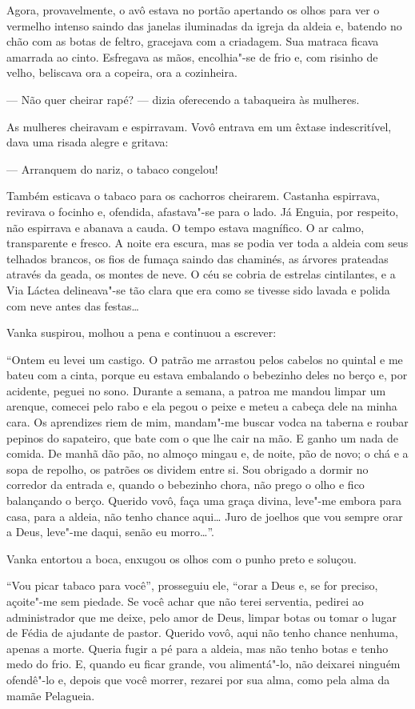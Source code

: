 Agora, provavelmente, o avô estava no portão apertando os olhos para ver
o vermelho intenso saindo das janelas iluminadas da igreja da aldeia
e, batendo no chão com as botas de feltro, gracejava com a criadagem.
Sua matraca ficava amarrada ao cinto. Esfregava as mãos, encolhia"-se de
frio e, com risinho de velho, beliscava ora a copeira, ora a cozinheira.

--- Não quer cheirar rapé? --- dizia oferecendo a tabaqueira às
mulheres.

As mulheres cheiravam e espirravam. Vovô entrava em um êxtase
indescritível, dava uma risada alegre e gritava:

--- Arranquem do nariz, o tabaco congelou!

Também esticava o tabaco para os cachorros cheirarem. Castanha
espirrava, revirava o focinho e, ofendida, afastava"-se para o lado. Já
Enguia, por respeito, não espirrava e abanava a cauda. O tempo estava
magnífico. O ar calmo, transparente e fresco. A noite era escura, mas se
podia ver toda a aldeia com seus telhados brancos, os fios de fumaça
saindo das chaminés, as árvores prateadas através da geada, os montes de neve.
O céu se cobria de estrelas cintilantes, e a Via Láctea delineava"-se tão
clara que era como se tivesse sido lavada e polida com neve antes das
festas\ldots{}

Vanka suspirou, molhou a pena e continuou a escrever:

``Ontem eu levei um castigo. O patrão me arrastou pelos cabelos no
quintal e me bateu com a cinta, porque eu estava embalando o bebezinho
deles no berço e, por acidente, peguei no sono. Durante a semana, a
patroa me mandou limpar um arenque, comecei pelo rabo e ela pegou o
peixe e meteu a cabeça dele na minha cara. Os aprendizes riem de mim,
mandam"-me buscar vodca na taberna e roubar pepinos do sapateiro, que
bate com o que lhe cair na mão. E ganho um nada de comida. De manhã dão
pão, no almoço mingau e, de noite, pão de novo; o chá e a sopa de
repolho, os patrões os dividem entre si. Sou obrigado a dormir no corredor da
entrada e, quando o bebezinho chora, não prego o olho e fico
balançando o berço. Querido vovô, faça uma graça divina, leve"-me embora
para casa, para a aldeia, não tenho chance aqui\ldots{} Juro de joelhos que
vou sempre orar a Deus, leve"-me daqui, senão eu morro\ldots{}''.

Vanka entortou a boca, enxugou os olhos com o punho preto e soluçou.

``Vou picar tabaco para você'', prosseguiu ele, ``orar a Deus e, se for
preciso, açoite"-me sem piedade. Se você achar que não terei serventia,
pedirei ao administrador que me deixe, pelo amor de Deus, limpar botas
ou tomar o lugar de Fédia de ajudante de pastor. Querido vovô, aqui não
tenho chance nenhuma, apenas a morte. Queria fugir a pé para a aldeia,
mas não tenho botas e tenho medo do frio. E, quando eu ficar grande, vou
alimentá"-lo, não deixarei ninguém ofendê"-lo e, depois que você morrer,
rezarei por sua alma, como pela alma da mamãe Pelagueia.

